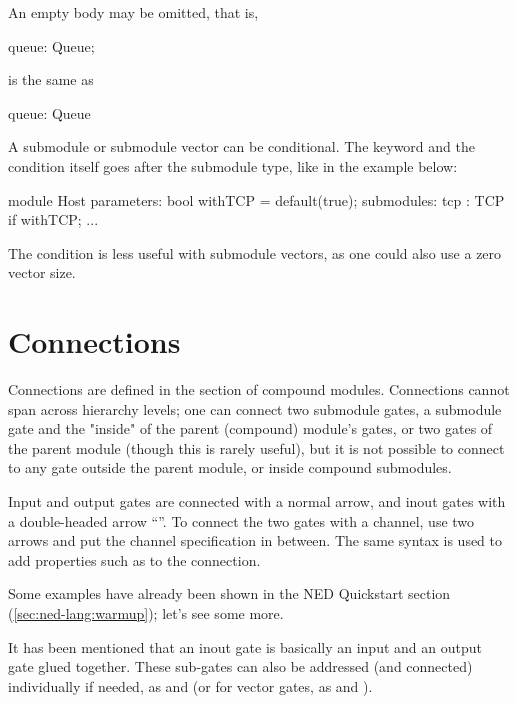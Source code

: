 An empty body may be omitted, that is,

\begin{ned}
      queue: Queue;
\end{ned}

is the same as

\begin{ned}
      queue: Queue {
      }
\end{ned}

A submodule or submodule vector can be conditional. The 
keyword and the condition itself goes after the submodule type, like in the
example below:

\begin{ned}
module Host
{
    parameters:
        bool withTCP = default(true);
    submodules:
        tcp : TCP if withTCP;
        ...
}
\end{ned}

The condition is less useful with submodule vectors, as one could also
use a zero vector size.


\section{Connections}
\label{sec:ned-lang:connections}

Connections are defined in the  section of compound
modules. Connections cannot span across hierarchy levels; one can connect
two submodule gates, a submodule gate and the "inside" of the parent
(compound) module's gates, or two gates of the parent module (though this
is rarely useful), but it is not possible to connect to any gate outside the
parent module, or inside compound submodules.

Input and output gates are connected with a normal arrow, and inout gates
with a double-headed arrow ``\ttt{<-{}->}''. To connect the two gates
with a channel, use two arrows and put the channel specification in between.
The same syntax is used to add properties such as  to the
connection.

Some examples have already been shown in the NED Quickstart section
(\ref{sec:ned-lang:warmup}); let's see some more.



It has been mentioned that an inout gate is basically an input and an
output gate glued together. These sub-gates can also be addressed (and
connected) individually if needed, as  and  (or
for vector gates, as  and ).

